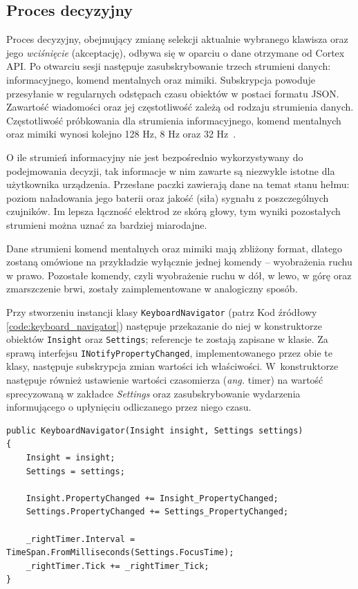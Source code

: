 \documentclass[skorowidz,skroty]{dyplomWEZUT}
\begin{document}
\subsection{Proces decyzyjny}
Proces decyzyjny, obejmujący zmianę selekcji aktualnie wybranego klawisza oraz jego \textit{wciśnięcie} (akceptację), odbywa się w oparciu o dane otrzymane od Cortex API. Po otwarciu sesji następuje zasubskrybowanie trzech strumieni danych: informacyjnego, komend mentalnych oraz mimiki. Subskrypcja powoduje przesyłanie w regularnych odstępach czasu obiektów w postaci formatu JSON. Zawartość wiadomości oraz jej częstotliwość zależą od rodzaju strumienia danych. Częstotliwość próbkowania dla strumienia informacyjnego, komend mentalnych oraz mimiki wynosi kolejno 128 Hz, 8 Hz oraz 32 Hz~\cite{cortexdoc}.

O ile strumień informacyjny nie jest bezpośrednio wykorzystywany do podejmowania decyzji, tak informacje w nim zawarte są niezwykle istotne dla użytkownika urządzenia. Przesłane paczki zawierają dane na temat stanu hełmu: poziom naładowania jego baterii oraz jakość (siła) sygnału z poszczególnych czujników. Im lepsza łączność elektrod ze skórą głowy, tym wyniki pozostałych strumieni można uznać za bardziej miarodajne.

Dane strumieni komend mentalnych oraz mimiki mają zbliżony format, dlatego zostaną omówione na przykładzie wyłącznie jednej komendy -- wyobrażenia ruchu w prawo. Pozostałe komendy, czyli wyobrażenie ruchu w dół, w lewo, w górę oraz zmarszczenie brwi, zostały zaimplementowane w analogiczny sposób.

Przy stworzeniu instancji klasy \lstinline[language={[Sharp]C}]{KeyboardNavigator} (patrz Kod źródłowy \vref{code:keyboard_navigator}) następuje przekazanie do niej w konstruktorze obiektów \lstinline[language={[Sharp]C}]{Insight} oraz \lstinline[language={[Sharp]C}]{Settings}; referencje te zostają zapisane w klasie. Za sprawą interfejsu \lstinline[language={[Sharp]C}]{INotifyPropertyChanged}, implementowanego przez obie te klasy, następuje subskrypcja zmian wartości ich właściwości. W~konstruktorze następuje również ustawienie wartości czasomierza (\textit{ang.} timer) na wartość sprecyzowaną w zakładce \textit{Settings} oraz zasubskrybowanie wydarzenia informującego o upłynięciu odliczanego przez niego czasu.

\begin{lstlisting}[language={[Sharp]C}]
public KeyboardNavigator(Insight insight, Settings settings)
{
    Insight = insight;
    Settings = settings;

    Insight.PropertyChanged += Insight_PropertyChanged;
    Settings.PropertyChanged += Settings_PropertyChanged;

    _rightTimer.Interval = TimeSpan.FromMilliseconds(Settings.FocusTime);
    _rightTimer.Tick += _rightTimer_Tick;
}
\end{lstlisting}
\end{document}

